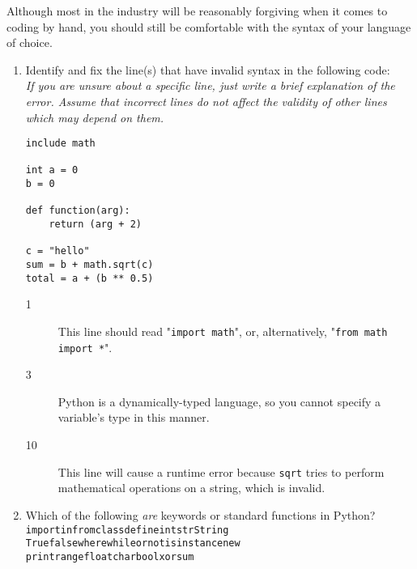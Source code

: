Although most in the industry will be reasonably forgiving when it comes to coding by hand,
you should still be comfortable with the syntax of your language of choice.

\begin{enumerate}
\item Identify and fix the line(s) that have invalid syntax in the following code:\\
\emph{If you are unsure about a specific line, just write a brief explanation of the error. Assume that incorrect lines do not affect the validity of other lines which may depend on them.}
\begin{lstlisting}
include math

int a = 0
b = 0

def function(arg):
	return (arg + 2)

c = "hello"
sum = b + math.sqrt(c)
total = a + (b ** 0.5)
\end{lstlisting}

\begin{answer}
\begin{description}

	\item[1] This line should read "\texttt{import math}", or, alternatively, "\texttt{from math import *}".
	\item[3] Python is a dynamically-typed language, so you cannot specify a variable's type in this manner.
	\item[10] This line will cause a runtime error because \texttt{sqrt} tries to perform mathematical operations on a string, which is invalid.

\end{description}
\end{answer}

\item Which of the following \textit{are} keywords or standard functions in Python?\\
\texttt{import\hspace{10mm}in\hspace{10mm}from\hspace{10mm}class\hspace{10mm}define\hspace{10mm}int\hspace{10mm}str\hspace{10mm}String}\\
\texttt{True\hspace{9mm}false\hspace{9mm}where\hspace{9mm}while\hspace{9mm}or\hspace{9mm}not\hspace{9mm}isinstance\hspace{9mm}new}\\
\texttt{print\hspace{13mm}range\hspace{13mm}float\hspace{13mm}char\hspace{13mm}bool\hspace{13mm}xor\hspace{13mm}sum}\\


\end{enumerate}
